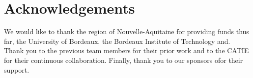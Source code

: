 \section{Acknowledgements}

We would like to thank the region of Nouvelle-Aquitaine for providing funds thus far,
the University of Bordeaux, the Bordeaux Institute of Technology and.
Thank you to the previous team members for their prior work and to the CATIE
for their continuous collaboration. Finally, thank you to our sponsors ofor their support.
